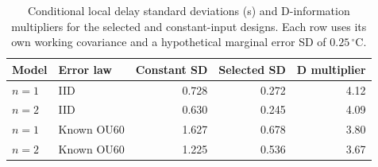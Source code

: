 \begin{table}[htbp]
\centering
\small
\caption{Conditional local delay standard deviations (s) and D-information multipliers for the selected and constant-input designs. Each row uses its own working covariance and a hypothetical marginal error SD of $0.25\,{}^\circ\mathrm C$.}
\label{tab:teaching-doe}
\begin{tabular}{llrrr}
\toprule
Model & Error law & Constant SD & Selected SD & D multiplier \\
\midrule
$n=1$ & IID & 0.728 & 0.272 & 4.12 \\
$n=2$ & IID & 0.630 & 0.245 & 4.09 \\
$n=1$ & Known OU60 & 1.627 & 0.678 & 3.80 \\
$n=2$ & Known OU60 & 1.225 & 0.536 & 3.67 \\
\bottomrule
\end{tabular}
\end{table}
